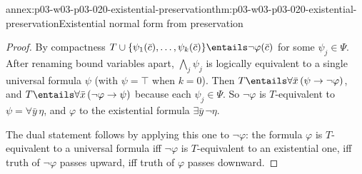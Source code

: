 \begin{annexitem}{annex:p03-w03-p03-020-existential-preservation}{thm:p03-w03-p03-020-existential-preservation}{Existential normal form from preservation}
\begin{proof}
By compactness \(T\cup\{\psi_1(\bar c),\ldots,\psi_k(\bar c)\}\entails
\neg\varphi(\bar c)\) for some \(\psi_j\in\Psi\). After renaming bound
variables apart, \(\bigwedge_j\psi_j\) is logically equivalent to a single
universal formula \(\psi\) (with \(\psi=\top\) when \(k=0\)). Then
\(T\entails\forall\bar x\,(\psi\to\neg\varphi)\), and
\(T\entails\forall\bar x\,(\neg\varphi\to\psi)\) because each
\(\psi_j\in\Psi\). So \(\neg\varphi\) is \(T\)-equivalent to
\(\psi=\forall\bar y\,\eta\), and \(\varphi\) to the existential formula
\(\exists\bar y\,\neg\eta\).

The dual statement follows by applying this one to \(\neg\varphi\): the
formula \(\varphi\) is \(T\)-equivalent to a universal formula iff
\(\neg\varphi\) is \(T\)-equivalent to an existential one, iff truth of
\(\neg\varphi\) passes upward, iff truth of \(\varphi\) passes downward.
\end{proof}
\end{annexitem}

